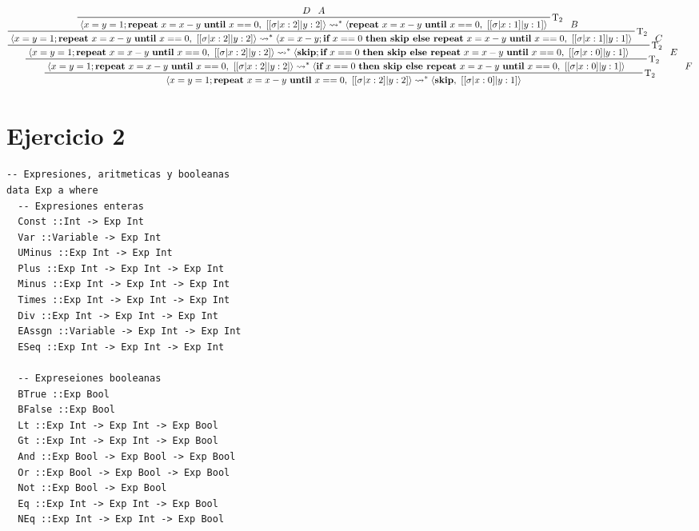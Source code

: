 \documentclass[11pt]{article}
\newcommand{\curly}{\mathrel{\leadsto}}
\begin{document}
\begin{landscape}
\begin{displaymath}
    \prftree[r]{$\mathrm{T_2}$}{
        \prftree[r]{$\mathrm{T_2}$}{
            \prftree[r]{$\mathrm{T_2}$}{
                \prftree[r]{$\mathrm{T_2}$}{
                    \prftree[r]{$\mathrm{T_2}$}{D}{A}
                    {\langle x=y=1; \textbf{repeat}\ x=x-y\ \textbf{until}\ x==0,\ [[\sigma|x:2]|y:2] \rangle \curly^* \langle \textbf{repeat}\ x=x-y\ \textbf{until}\ x==0,\ [[\sigma|x:1]|y:1] \rangle}
                }{B}
                {\langle x=y=1; \textbf{repeat}\ x=x-y\ \textbf{until}\ x==0,\ [[\sigma|x:2]|y:2] \rangle \curly^* \langle x=x-y; \textbf{if}\ x==0\ \textbf{then\ skip\ else\ repeat}\ x=x-y\ \textbf{until}\ x==0,\ [[\sigma|x:1]|y:1] \rangle}
            }{C}
            {\langle x=y=1; \textbf{repeat}\ x=x-y\ \textbf{until}\ x==0,\ [[\sigma|x:2]|y:2] \rangle \curly^* \langle \textbf{skip}; \textbf{if}\ x==0\ \textbf{then\ skip\ else\ repeat}\ x=x-y\ \textbf{until}\ x==0,\ [[\sigma|x:0]|y:1] \rangle}
        }{E}
        {\langle x=y=1; \textbf{repeat}\ x=x-y\ \textbf{until}\ x==0,\ [[\sigma|x:2]|y:2] \rangle \curly^* \langle \textbf{if}\ x==0\ \textbf{then\ skip\ else\ repeat}\ x=x-y\ \textbf{until}\ x==0,\ [[\sigma|x:0]|y:1] \rangle}
    }{F}
    {\langle x=y=1; \textbf{repeat}\ x=x-y\ \textbf{until}\ x==0,\ [[\sigma|x:2]|y:2] \rangle \curly^* \langle \textbf{skip},\ [[\sigma|x:0]|y:1] \rangle}
\end{displaymath}
\end{landscape}


\section*{Ejercicio 2}

\begin{lstlisting}[style = HaskellStyle]
    -- Expresiones, aritmeticas y booleanas
data Exp a where
  -- Expresiones enteras
  Const ::Int -> Exp Int
  Var ::Variable -> Exp Int
  UMinus ::Exp Int -> Exp Int
  Plus ::Exp Int -> Exp Int -> Exp Int
  Minus ::Exp Int -> Exp Int -> Exp Int
  Times ::Exp Int -> Exp Int -> Exp Int
  Div ::Exp Int -> Exp Int -> Exp Int
  EAssgn ::Variable -> Exp Int -> Exp Int
  ESeq ::Exp Int -> Exp Int -> Exp Int

  -- Expreseiones booleanas
  BTrue ::Exp Bool
  BFalse ::Exp Bool
  Lt ::Exp Int -> Exp Int -> Exp Bool
  Gt ::Exp Int -> Exp Int -> Exp Bool
  And ::Exp Bool -> Exp Bool -> Exp Bool
  Or ::Exp Bool -> Exp Bool -> Exp Bool
  Not ::Exp Bool -> Exp Bool
  Eq ::Exp Int -> Exp Int -> Exp Bool
  NEq ::Exp Int -> Exp Int -> Exp Bool
\end{lstlisting}
\end{document}
